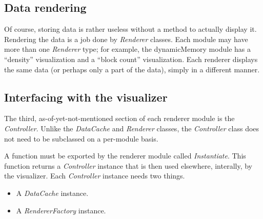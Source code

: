 \subsection{Data rendering}
Of course, storing data is rather useless without a method to actually display it. Rendering the data is a job done by
\emph{Renderer} classes. Each module may have more than one \emph{Renderer} type; for example, the dynamicMemory module
has a ``density'' visualization and a ``block count'' visualization. Each renderer displays the same data (or perhaps
only a part of the data), simply in a different manner.


\subsection{Interfacing with the visualizer}
The third, as-of-yet-not-mentioned section of each renderer module is the \emph{Controller}. Unlike the
\emph{DataCache} and \emph{Renderer} classes, the \emph{Controller} class does not need to be subclassed on a
per-module basis.

A function must be exported by the renderer module called \emph{Instantiate}. This function returns a \emph{Controller}
instance that is then used elsewhere, interally, by the visualizer. Each \emph{Controller} instance needs two things.

\begin{itemize}
  \item A \emph{DataCache} instance.
  \item A \emph{RendererFactory} instance.
\end{itemize}

